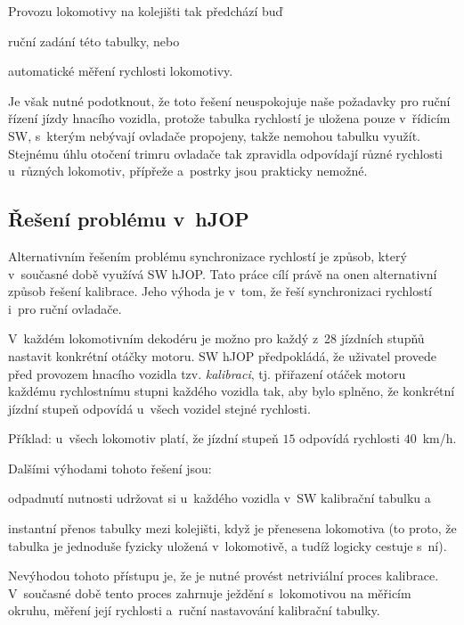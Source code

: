 Provozu lokomotivy na kolejišti tak předchází buď

\begin{compactitem}
	\item ruční zadání této tabulky, nebo
	\item automatické měření rychlosti lokomotivy.
\end{compactitem}

Je však nutné podotknout, že toto řešení neuspokojuje naše požadavky pro
ruční řízení jízdy hnacího vozidla, protože tabulka rychlostí je uložena
pouze v~řídicím SW, s~kterým nebývají ovladače propojeny, takže nemohou tabulku
využít. Stejnému úhlu otočení trimru ovladače tak zpravidla odpovídají různé
rychlosti u~různých lokomotiv, přípřeže a~postrky jsou prakticky nemožné.

\subsection{Řešení problému v~hJOP}

Alternativním řešením problému synchronizace rychlostí je způsob, který
v~současné době využívá SW hJOP. Tato práce cílí právě na onen alternativní
způsob řešení kalibrace. Jeho výhoda je v~tom, že řeší synchronizaci
rychlostí i~pro ruční ovladače.

V~každém lokomotivním dekodéru je možno pro každý z~28 jízdních stupňů nastavit
konkrétní otáčky motoru. SW hJOP předpokládá, že uživatel provede před
provozem hnacího vozidla tzv. \textit{kalibraci}, tj. přiřazení otáček motoru
každému rychlostnímu stupni každého vozidla tak, aby bylo splněno, že konkrétní
jízdní stupeň odpovídá u~všech vozidel stejné rychlosti.

Příklad: u~všech lokomotiv platí, že jízdní stupeň $15$ odpovídá rychlosti
$40$~km/h.

Dalšími výhodami tohoto řešení jsou:

\begin{compactenum}
	\item odpadnutí nutnosti udržovat si u~každého vozidla v~SW kalibrační
	tabulku a
	\item instantní přenos tabulky mezi kolejišti, když je přenesena
	lokomotiva (to proto, že tabulka je jednoduše fyzicky uložená v~lokomotivě,
	a tudíž logicky cestuje s~ní).
\end{compactenum}

Nevýhodou tohoto přístupu je, že je nutné provést netriviální proces kalibrace.
V~současné době tento proces zahrnuje ježdění s~lokomotivou na měřicím okruhu,
měření její rychlosti a~ruční nastavování kalibrační tabulky.

